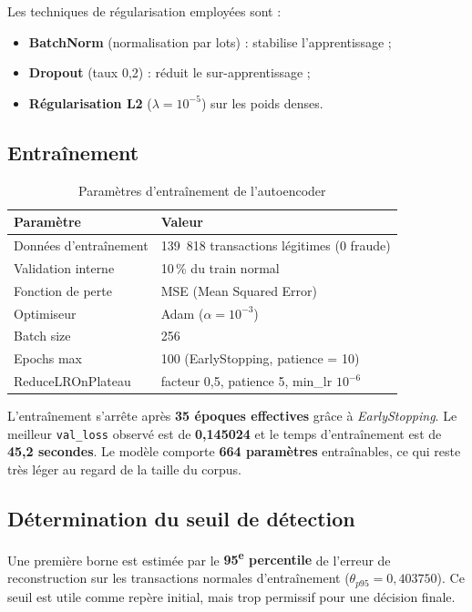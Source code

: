 Les techniques de régularisation employées sont :
\begin{itemize}
  \item \textbf{BatchNorm} (normalisation par lots) : stabilise l'apprentissage ;
  \item \textbf{Dropout} (taux 0,2) : réduit le sur-apprentissage ;
  \item \textbf{Régularisation L2} ($\lambda = 10^{-5}$) sur les poids denses.
\end{itemize}

\subsection{Entraînement}

\begin{table}[H]
\centering
\caption{Paramètres d'entraînement de l'autoencoder}
\label{tab:ae_training}
\begin{tabular}{ll}
\toprule
\textbf{Paramètre} & \textbf{Valeur} \\
\midrule
Données d'entraînement  & 139~818 transactions légitimes (0 fraude) \\
Validation interne      & 10\,\% du train normal \\
Fonction de perte       & MSE (Mean Squared Error) \\
Optimiseur              & Adam ($\alpha = 10^{-3}$) \\
Batch size              & 256 \\
Epochs max              & 100 (EarlyStopping, patience = 10) \\
ReduceLROnPlateau       & facteur 0,5, patience 5, min\_lr $10^{-6}$ \\
\bottomrule
\end{tabular}
\end{table}

L'entraînement s'arrête après \textbf{35 époques effectives} grâce à \textit{EarlyStopping}.
Le meilleur \texttt{val\_loss} observé est de \textbf{0,145024} et le temps d'entraînement
est de \textbf{45,2 secondes}. Le modèle comporte \textbf{664 paramètres} entraînables,
ce qui reste très léger au regard de la taille du corpus.

\subsection{Détermination du seuil de détection}

Une première borne est estimée par le \textbf{95\textsuperscript{e} percentile} de
l'erreur de reconstruction sur les transactions normales d'entraînement
($\theta_{p95} = 0{,}403750$). Ce seuil est utile comme repère initial, mais trop permissif
pour une décision finale.

